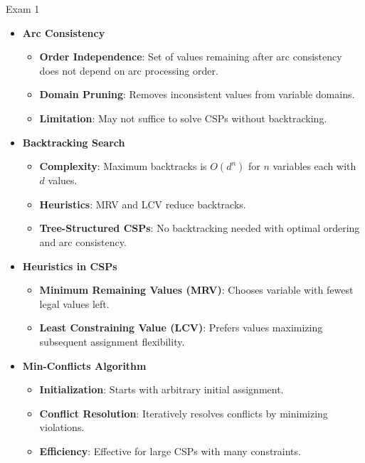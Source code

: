 \begin{examnotes}{Exam 1}
\begin{highlight}
        \begin{itemize}
            \item \textbf{Arc Consistency}
                \begin{itemize}
                    \item \textbf{Order Independence}: Set of values remaining after arc consistency does not depend on arc processing order.
                    \item \textbf{Domain Pruning}: Removes inconsistent values from variable domains.
                    \item \textbf{Limitation}: May not suffice to solve CSPs without backtracking.
                \end{itemize}
            \item \textbf{Backtracking Search}
                \begin{itemize}
                    \item \textbf{Complexity}: Maximum backtracks is $O(d^n)$ for $n$ variables each with $d$ values.
                    \item \textbf{Heuristics}: MRV and LCV reduce backtracks.
                    \item \textbf{Tree-Structured CSPs}: No backtracking needed with optimal ordering and arc consistency.
                \end{itemize}
            \item \textbf{Heuristics in CSPs}
                \begin{itemize}
                    \item \textbf{Minimum Remaining Values (MRV)}: Chooses variable with fewest legal values left.
                    \item \textbf{Least Constraining Value (LCV)}: Prefers values maximizing subsequent assignment flexibility.
                \end{itemize}
            \item \textbf{Min-Conflicts Algorithm}
                \begin{itemize}
                    \item \textbf{Initialization}: Starts with arbitrary initial assignment.
                    \item \textbf{Conflict Resolution}: Iteratively resolves conflicts by minimizing violations.
                    \item \textbf{Efficiency}: Effective for large CSPs with many constraints.
                \end{itemize}
        \end{itemize}
    \end{highlight}


\end{examnotes}
